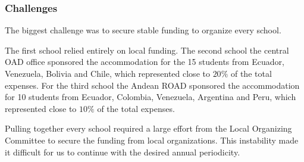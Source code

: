 \subsubsection{Challenges}

The biggest challenge was to secure stable funding to organize every school.
 
The first school relied entirely on local funding.
The second school the central OAD office sponsored the
accommodation for the 15 students from Ecuador, Venezuela, 
Bolivia and Chile, which represented close to $20\%$ of the total expenses.
For the third school the Andean ROAD sponsored the accommodation for 10 students from 
Ecuador, Colombia, Venezuela, Argentina and Peru, which represented close to $10\%$ of the total expenses.

Pulling together every school required a large effort from the Local
Organizing Committee to secure the funding from local organizations.
This instability made it difficult for us to continue with the desired annual periodicity.


 
 

